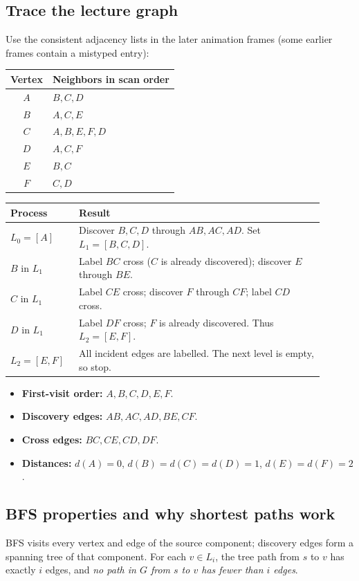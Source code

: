 \documentclass[11pt,letterpaper]{article}
\begin{document}
\subsection{Trace the lecture graph}
Use the consistent adjacency lists in the later animation frames (some earlier frames contain a mistyped entry):
\begin{center}
\begin{tabular}{cl}
\toprule
Vertex & Neighbors in scan order \\
\midrule
$A$ & $B,C,D$ \\
$B$ & $A,C,E$ \\
$C$ & $A,B,E,F,D$ \\
$D$ & $A,C,F$ \\
$E$ & $B,C$ \\
$F$ & $C,D$ \\
\bottomrule
\end{tabular}
\end{center}
\begin{center}
\begin{tabular}{p{0.18\linewidth}p{0.72\linewidth}}
\toprule
Process & Result \\
\midrule
$L_0=[A]$ & Discover $B,C,D$ through $AB,AC,AD$. Set $L_1=[B,C,D]$. \\
$B$ in $L_1$ & Label $BC$ cross ($C$ is already discovered); discover $E$ through $BE$. \\
$C$ in $L_1$ & Label $CE$ cross; discover $F$ through $CF$; label $CD$ cross. \\
$D$ in $L_1$ & Label $DF$ cross; $F$ is already discovered. Thus $L_2=[E,F]$. \\
$L_2=[E,F]$ & All incident edges are labelled. The next level is empty, so stop. \\
\bottomrule
\end{tabular}
\end{center}
\begin{itemize}
    \item \textbf{First-visit order:} $A,B,C,D,E,F$.
    \item \textbf{Discovery edges:} $AB,AC,AD,BE,CF$.
    \item \textbf{Cross edges:} $BC,CE,CD,DF$.
    \item \textbf{Distances:} $d(A)=0$, $d(B)=d(C)=d(D)=1$, $d(E)=d(F)=2$.
\end{itemize}

\subsection{BFS properties and why shortest paths work}
BFS visits every vertex and edge of the source component; discovery edges form a spanning tree of that component. For each $v\in L_i$, the tree path from $s$ to $v$ has exactly $i$ edges, and \emph{no path in $G$ from $s$ to $v$ has fewer than $i$ edges}.
\end{document}
